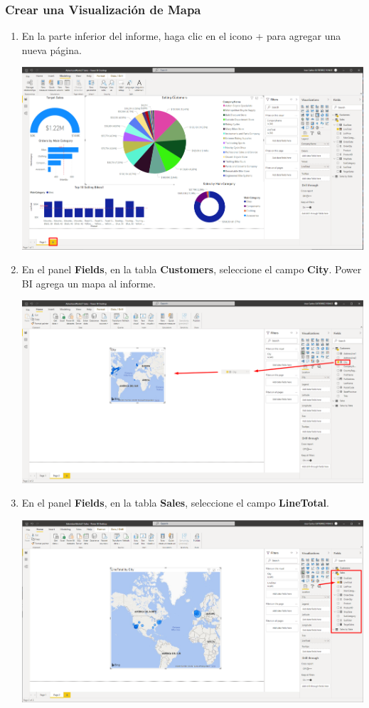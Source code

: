 \documentclass[12pt,letterpaper]{article}
\newcommand\tab[1][1cm]{\hspace*{#1}}
\begin{document}
    \subsubsection{Crear una Visualización de Mapa}
    \begin{enumerate}[\tab 1.]
        \item En la parte inferior del informe, haga clic en el icono + para agregar una nueva página.
        \begin{center}
            \includegraphics[width=13cm]{./img/img119.png}
        \end{center}
        \item En el panel \textbf{Fields}, en la tabla \textbf{Customers}, seleccione el campo \textbf{City}. Power BI agrega un mapa al informe.
        \begin{center}
            \includegraphics[width=13cm]{./img/img120.png}
        \end{center}
        \item En el panel \textbf{Fields}, en la tabla \textbf{Sales}, seleccione el campo \textbf{LineTotal}.
        \begin{center}
            \includegraphics[width=13cm]{./img/img121.png}

\end{center}
\end{enumerate}
\end{document}
